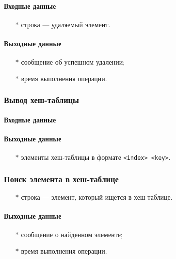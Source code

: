 \documentclass[a4paper,12pt]{extarticle}
\begin{document}
\paragraph{Входные данные}
\begin{itemize}
    \item[$*$] строка --- удаляемый элемент.
\end{itemize}

\paragraph{Выходные данные}
\begin{itemize}
    \item[$*$] сообщение об успешном удалении;
    \item[$*$] время выполнения операции.
\end{itemize}

\subsubsection{Вывод хеш-таблицы}

\paragraph{Входные данные}

\paragraph{Выходные данные}
\begin{itemize}
    \item[$*$] элементы хеш-таблицы в формате \texttt{<index> <key>}.
\end{itemize}

\subsubsection{Поиск элемента в хеш-таблице}

\begin{itemize}
    \item[$*$] строка --- элемент, который ищется в хеш-таблице.
\end{itemize}

\paragraph{Выходные данные}
\begin{itemize}
    \item[$*$] сообщение о найденном элементе;
    \item[$*$] время выполнения операции.
\end{itemize}
\end{document}
